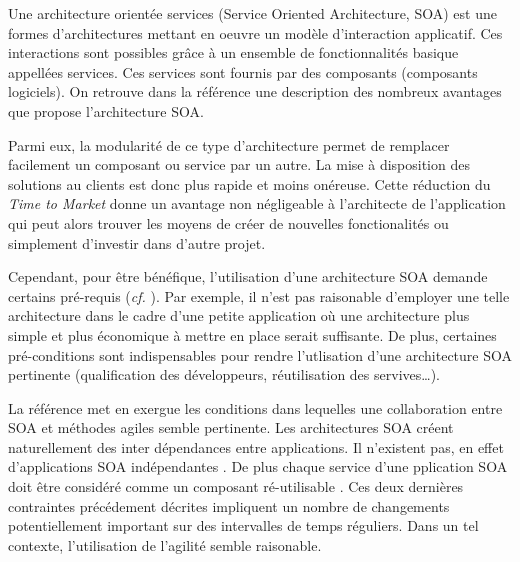 \documentclass[11pt,a4paper,utf8x]{article}
\begin{document}
Une architecture orientée services (Service Oriented Architecture, SOA) est une formes d'architectures mettant en oeuvre un modèle d'interaction applicatif. Ces interactions sont possibles grâce à un ensemble de fonctionnalités basique appellées services. Ces services sont fournis par des composants (composants logiciels). On retrouve dans la référence \cite{soa} une description des nombreux avantages que propose l'architecture SOA.


Parmi eux, la modularité de ce type d'architecture permet de remplacer facilement un composant ou service par un autre. La mise à disposition des solutions au clients est donc plus rapide et moins onéreuse. Cette réduction du \emph{Time to Market} donne un avantage non négligeable à l'architecte de l'application qui peut alors trouver les moyens de créer de nouvelles fonctionalités ou simplement d'investir dans d'autre projet.


Cependant, pour être bénéfique, l'utilisation d'une architecture SOA demande certains pré-requis (\textit{cf.} \cite{soa}). Par exemple, il n'est pas raisonable d'employer une telle architecture dans le cadre d'une petite application où une architecture plus simple et plus économique à mettre en place serait suffisante. De plus, certaines pré-conditions sont indispensables pour rendre l'utlisation d'une architecture SOA pertinente (qualification des développeurs, réutilisation des servives\dots).


La référence \cite{ibm} met en exergue les conditions dans lequelles une collaboration entre SOA et méthodes agiles semble pertinente. Les architectures SOA créent naturellement des inter dépendances entre applications. Il n'existent pas, en effet d'applications SOA \og indépendantes \fg{}. De plus chaque service d'une pplication SOA doit être considéré comme un composant \og ré-utilisable \fg{}. Ces deux dernières contraintes précédement décrites impliquent un nombre de changements potentiellement important sur des intervalles de temps réguliers. Dans un tel contexte, l'utilisation de l'agilité semble raisonable.  





% 
%
% 
% 
% 


% 


\end{document}
